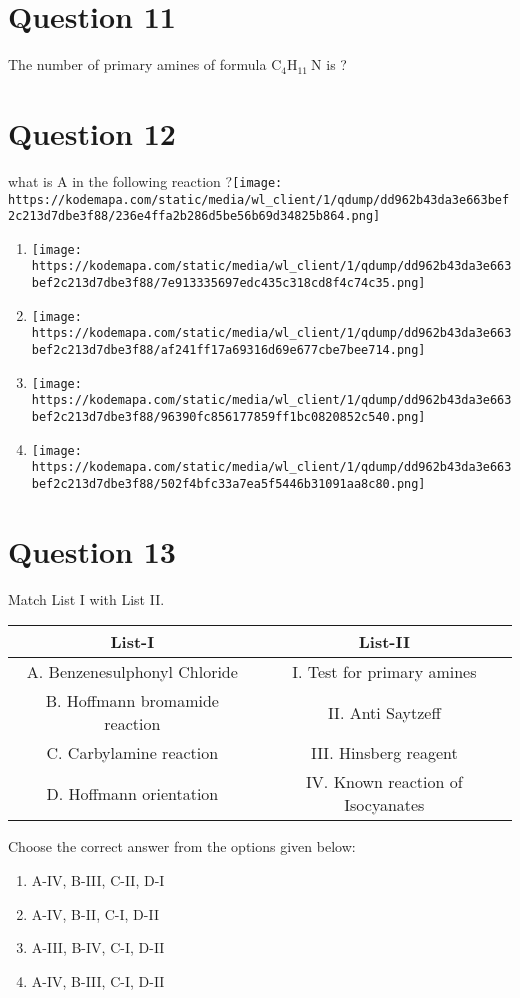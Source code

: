 \documentclass{article}
\begin{document}
\section*{Question 11}
The number of primary amines of formula \(\mathrm{C}_4 \mathrm{H}_{11} \mathrm{~N}\) is ? 
\begin{enumerate}[label=(\alph*)]
\end{enumerate}
\newpage
\section*{Question 12}
what is A in the following reaction ?\texttt{[image: https://kodemapa.com/static/media/wl\_client/1/qdump/dd962b43da3e663bef2c213d7dbe3f88/236e4ffa2b286d5be56b69d34825b864.png]}\newline
\begin{enumerate}[label=(\alph*)]
\item \texttt{[image: https://kodemapa.com/static/media/wl\_client/1/qdump/dd962b43da3e663bef2c213d7dbe3f88/7e913335697edc435c318cd8f4c74c35.png]}
\item \texttt{[image: https://kodemapa.com/static/media/wl\_client/1/qdump/dd962b43da3e663bef2c213d7dbe3f88/af241ff17a69316d69e677cbe7bee714.png]}
\item \texttt{[image: https://kodemapa.com/static/media/wl\_client/1/qdump/dd962b43da3e663bef2c213d7dbe3f88/96390fc856177859ff1bc0820852c540.png]}
\item \texttt{[image: https://kodemapa.com/static/media/wl\_client/1/qdump/dd962b43da3e663bef2c213d7dbe3f88/502f4bfc33a7ea5f5446b31091aa8c80.png]}
\end{enumerate}
\newpage
\section*{Question 13}
Match List I with List II.
    \setlength{\arrayrulewidth}{0.8mm}
    \begin{tabular}{|c|c|}
    \hline
    List-I & List-II \\
\hline
A. Benzenesulphonyl Chloride & I. Test for primary amines \\
\hline
B. Hoffmann bromamide reaction & II. Anti Saytzeff \\
\hline
C. Carbylamine reaction & III. Hinsberg reagent \\
\hline
D. Hoffmann orientation & IV. Known reaction of Isocyanates \\
\hline

    \end{tabular}
    \setlength{\arrayrulewidth}{0.4mm}
    Choose the correct answer from the options given below: \newline
\begin{enumerate}[label=(\alph*)]
\item A-IV, B-III, C-II, D-I
\item A-IV, B-II, C-I, D-II
\item A-III, B-IV, C-I, D-II
\item A-IV, B-III, C-I, D-II
\end{enumerate}
\newpage
\end{document}
